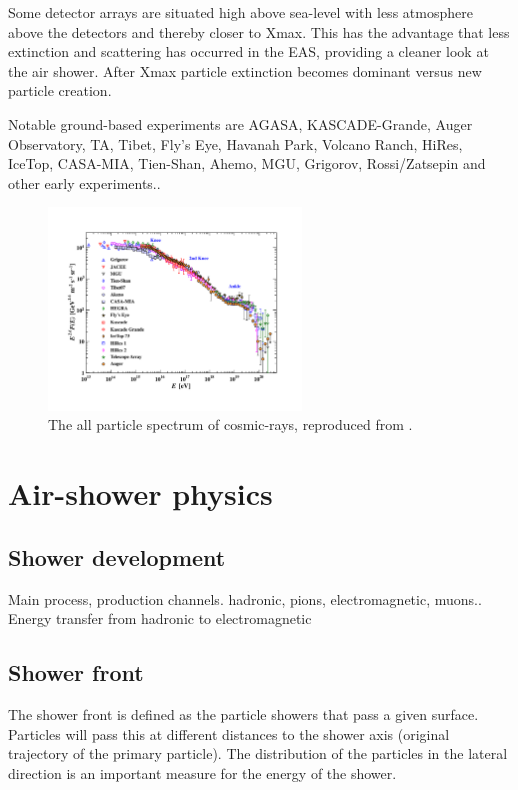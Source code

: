 Some detector arrays are situated high above sea-level with less atmosphere above the detectors and thereby closer to Xmax. This has the advantage that less extinction and scattering has occurred in the EAS, providing a cleaner look at the air shower. After Xmax particle extinction becomes dominant versus new particle creation.

Notable ground-based experiments are AGASA, KASCADE-Grande, Auger Observatory, TA, Tibet, Fly's Eye, Havanah Park, Volcano Ranch, HiRes, IceTop, CASA-MIA, Tien-Shan, Ahemo, MGU, Grigorov, Rossi/Zatsepin and other early experiments..

\begin{figure}
    \centering
    \includegraphics[width=0.6\textwidth]
                    {plots/cosmic-rays/PDG_28_8_all_particle_spectrum}
    \caption{The all particle spectrum of cosmic-rays, reproduced from \cite{olive2014pdg}.}
    \label{fig:spectrum}
\end{figure}


\section{Air-shower physics}
\label{sec:air-shower-physics}

\subsection{Shower development}

Main process, production channels. hadronic, pions, electromagnetic, muons..
Energy transfer from hadronic to electromagnetic


\subsection{Shower front}

The shower front is defined as the particle showers that pass a given surface. Particles will pass this at different distances to the shower axis (original trajectory of the primary particle). The distribution of the particles in the lateral direction is an important measure for the energy of the shower.

